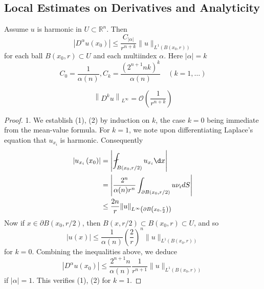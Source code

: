 \subsection{Local Estimates on Derivatives and Analyticity}
\begin{theorem}
    Assume $u$ is harmonic in $U\subset\mathbb{R}^n$.
    Then
    \begin{equation*}
        \left|D^\alpha u\left(x_0\right)\right|
        \leq
        \frac{C_{\left|\alpha\right|}}{r^{n+k}}\|u\|_{L^1\left(B\left(x_0, r\right)\right)}
        \tag{1}
    \end{equation*}
    for each ball $B\left(x_0, r\right) \subset U$ and each multiindex $\alpha$.
    Here $|\alpha|=k$
    \begin{equation*}
        C_0=\frac{1}{\alpha(n)}, C_k=\frac{\left(2^{n+1} n k\right)^k}{\alpha(n)} \quad(k=1, \ldots)
        \tag{2}
    \end{equation*}

    \begin{equation*}
        \left\|D^k u\right\|_{L^\infty}= \mathcal{O}\left(\frac{1}{r^{n+k}}\right)
    \end{equation*}
    \begin{proof}
        1. We establish (1), (2) by induction on $k$, the case $k=0$ being immediate from the mean-value formula. For $k=1$, we note upon differentiating Laplace's equation that $u_{x_i}$ is harmonic. Consequently
        \begin{equation*}
            \begin{aligned}
                \left|u_{x_i}\left(x_0\right)\right| & = \left|\fint_{B\left(x_0, r / 2\right)} u_{x_i} \d x\right|                                 \\
                                                     & =\left|\frac{2^n}{\alpha(n) r^n} \int_{\partial B\left(x_0, r / 2\right)} u \nu_i d S\right| \\
                                                     & \leq \frac{2 n}{r}\|u\|_{L^{\infty}\left(\partial B\left(x_0, \frac{r}{2}\right)\right)}
            \end{aligned}
        \end{equation*}
        Now if $x \in \partial B\left(x_0, r / 2\right)$, then $B(x, r / 2) \subset B\left(x_0, r\right) \subset U$, and so
        \begin{equation*}
            |u(x)| \leq \frac{1}{\alpha(n)}\left(\frac{2}{r}\right)^n\|u\|_{L^1\left(B\left(x_0, r\right)\right)}
        \end{equation*}
        for $k=0$. Combining the inequalities above, we deduce
        \begin{equation*}
            \left|D^\alpha u\left(x_0\right)\right| \leq \frac{2^{n+1} n}{\alpha(n)} \frac{1}{r^{n+1}}\|u\|_{L^1\left(B\left(x_0, r\right)\right)}
        \end{equation*}
        if $|\alpha|=1$. This verifies (1), (2) for $k=1$.


\end{proof}
\end{theorem}
